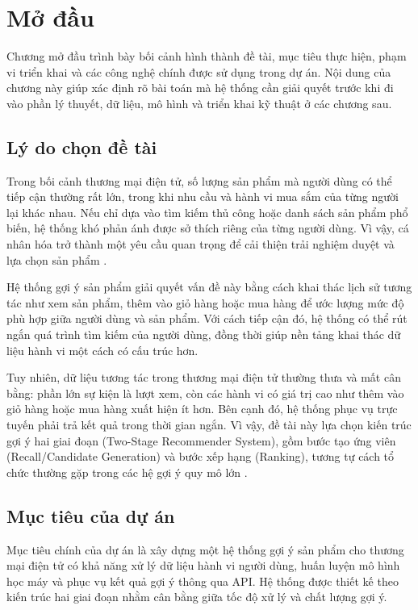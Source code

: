 ﻿\chapter{Mở đầu}

Chương mở đầu trình bày bối cảnh hình thành đề tài, mục tiêu thực hiện, phạm vi triển khai và các công nghệ chính được sử dụng trong dự án. Nội dung của chương này giúp xác định rõ bài toán mà hệ thống cần giải quyết trước khi đi vào phần lý thuyết, dữ liệu, mô hình và triển khai kỹ thuật ở các chương sau.

\section{Lý do chọn đề tài}
Trong bối cảnh thương mại điện tử, số lượng sản phẩm mà người dùng có thể tiếp cận thường rất lớn, trong khi nhu cầu và hành vi mua sắm của từng người lại khác nhau. Nếu chỉ dựa vào tìm kiếm thủ công hoặc danh sách sản phẩm phổ biến, hệ thống khó phản ánh được sở thích riêng của từng người dùng. Vì vậy, cá nhân hóa trở thành một yêu cầu quan trọng để cải thiện trải nghiệm duyệt và lựa chọn sản phẩm \cite{covington2016deep}.
\medskip

Hệ thống gợi ý sản phẩm giải quyết vấn đề này bằng cách khai thác lịch sử tương tác như xem sản phẩm, thêm vào giỏ hàng hoặc mua hàng để ước lượng mức độ phù hợp giữa người dùng và sản phẩm. Với cách tiếp cận đó, hệ thống có thể rút ngắn quá trình tìm kiếm của người dùng, đồng thời giúp nền tảng khai thác dữ liệu hành vi một cách có cấu trúc hơn.
\medskip

Tuy nhiên, dữ liệu tương tác trong thương mại điện tử thường thưa và mất cân bằng: phần lớn sự kiện là lượt xem, còn các hành vi có giá trị cao như thêm vào giỏ hàng hoặc mua hàng xuất hiện ít hơn. Bên cạnh đó, hệ thống phục vụ trực tuyến phải trả kết quả trong thời gian ngắn. Vì vậy, đề tài này lựa chọn kiến trúc gợi ý hai giai đoạn (Two-Stage Recommender System), gồm bước tạo ứng viên (Recall/Candidate Generation) và bước xếp hạng (Ranking), tương tự cách tổ chức thường gặp trong các hệ gợi ý quy mô lớn \cite{covington2016deep}.

\section{Mục tiêu của dự án}
Mục tiêu chính của dự án là xây dựng một hệ thống gợi ý sản phẩm cho thương mại điện tử có khả năng xử lý dữ liệu hành vi người dùng, huấn luyện mô hình học máy và phục vụ kết quả gợi ý thông qua API. Hệ thống được thiết kế theo kiến trúc hai giai đoạn nhằm cân bằng giữa tốc độ xử lý và chất lượng gợi ý.
\medskip

